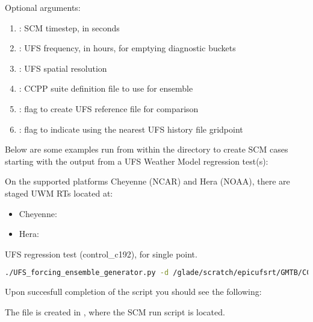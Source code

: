 Optional arguments:
\begin{enumerate}
\item {}: SCM timestep, in seconds
\item {}: UFS frequency, in hours, for emptying diagnostic buckets
\item {}: UFS spatial resolution
\item {}: CCPP suite definition file to use for ensemble
\item {}: flag to create UFS reference file for comparison
\item {}: flag to indicate using the nearest UFS history file gridpoint
\end{enumerate}

Below are some examples run from within the  directory to create SCM cases starting with the output from a UFS Weather Model regression test(s):

On the supported platforms Cheyenne (NCAR) and Hera (NOAA), there are staged UWM RTs located at:
\begin{itemize}
\item Cheyenne: 
\item Hera: 
\end{itemize}

UFS regression test (control_c192), for single point.
\begin{lstlisting}[language=bash]
./UFS_forcing_ensemble_generator.py -d /glade/scratch/epicufsrt/GMTB/CCPP-SCM/UFS_RTs/control_c192/ -sc --C_RES 192 -dt 360 -fhz 12 -n control_c192 -lons 300 -lats 34
\end{lstlisting}

Upon succesfull completion of the script you should see the following:

\exec{-------------------------------------------------------------------------------------------}


\exec{-------------------------------------------------------------------------------------------}

The file  is created in , where the SCM run script is located.

